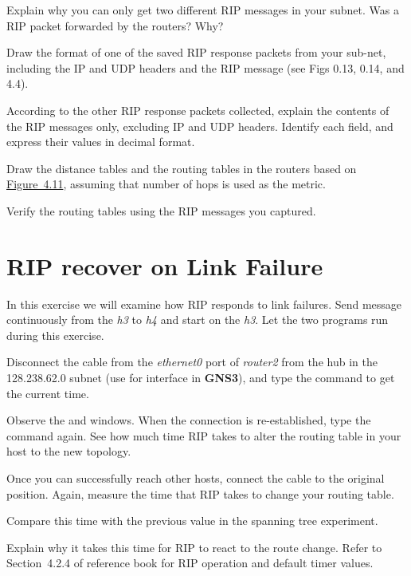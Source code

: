 \documentclass{../UTNetLab}
\begin{document}
\begin{report}
    \item Explain why you can only get two different RIP messages in your subnet.
    Was a RIP packet forwarded by the routers?
    Why?

    \item Draw the format of one of the saved RIP response packets from your sub-net, including the IP and UDP headers and the RIP message (see Figs 0.13, 0.14, and 4.4).

    \item According to the other RIP response packets collected, explain the contents of the RIP messages only, excluding IP and UDP headers.
    Identify each field, and express their values in decimal format.


    \item Draw the distance tables and the routing tables in the routers based on \hyperref[fig:4.11]{Figure~4.11}, assuming that number of hops is used as the metric.

    \item Verify the routing tables using the RIP messages you captured.
\end{report}


\section{RIP recover on Link Failure}
In this exercise we will examine how RIP responds to link failures.
Send  message continuously from the \textit{h3} to \textit{h4} and start  on the \textit{h3}.
Let the two programs run during this exercise.

Disconnect the cable from the \textit{ethernet0} port of \textit{router2} from the hub in the 128.238.62.0 subnet (use  for interface in \textbf{GNS3}), and type the  command to get the current time.

Observe the  and  windows.
When the connection is re-established, type the  command again.
See how much time RIP takes to alter the routing table in your host to the new topology.

Once you can successfully reach other hosts, connect the cable to the original position.
Again, measure the time that RIP takes to change your routing table.

\begin{report}
    \item Compare this time with the previous value in the spanning tree experiment.

    \item Explain why it takes this time for RIP to react to the route change.
    Refer to Section~4.2.4 of reference book for RIP operation and default timer values.
\end{report}
\end{document}
